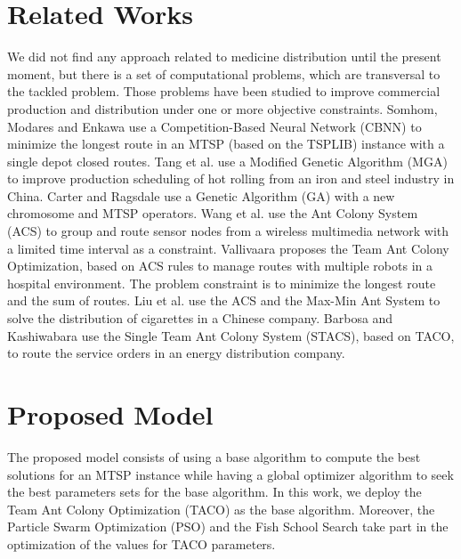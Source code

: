 \documentclass[runningheads]{llncs}
\begin{document}



\section{Related Works}
We did not find any approach related to medicine distribution until the present moment, but there is a set of computational problems, which are transversal to the tackled problem. Those problems have been studied to improve commercial production and distribution under one or more objective constraints.
Somhom, Modares and Enkawa \cite{somhom1999competition} use a Competition-Based Neural Network (CBNN) to minimize the longest route in an MTSP (based on the TSPLIB) instance with a single depot closed routes. Tang et al. \cite{tang2000multiple} use a Modified Genetic Algorithm (MGA) to improve production scheduling of hot rolling from an iron and steel industry in China. Carter and Ragsdale \cite{carter2006new} use a Genetic Algorithm (GA) with a new chromosome and MTSP operators. Wang et al. \cite{wang2007hierarchical} use the Ant Colony System (ACS) to group and route sensor nodes from a wireless multimedia network with a limited time interval as a constraint. Vallivaara \cite{vallivaara2008team} proposes the Team Ant Colony Optimization, based on ACS rules to manage routes with multiple robots in a hospital environment. The problem constraint is to minimize the longest route and the sum of routes. Liu et al. \cite{liu2009ant} use the ACS and the Max-Min Ant System to solve the distribution of cigarettes in a Chinese company. Barbosa and Kashiwabara \cite{barbosa2015aplicaccao} use the Single Team Ant Colony System (STACS), based on TACO, to route the service orders in an energy distribution company.

\section{Proposed Model}
The proposed model consists of using a base algorithm to compute the best solutions for an MTSP instance while having a global optimizer algorithm to seek the best parameters sets for the base algorithm. In this work, we deploy the Team Ant Colony Optimization (TACO) as the base algorithm. Moreover, the Particle Swarm Optimization (PSO) and the Fish School Search take part in the optimization of the values for TACO parameters.
\end{document}
